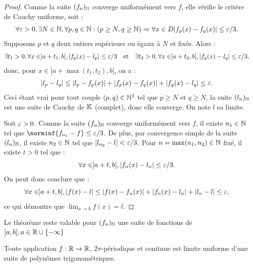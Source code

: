 \documentclass{article}
\begin{document}
\begin{proof}
Comme la suite $(f_n)_{\mathbb{N}}$ converge uniformément vers $f$, elle vérifie le critère de Cauchy uniforme, soit :
\[ \forall \varepsilon > 0, \exists N \in \mathbb{N}, \forall p,q \in \mathbb{N} : 
(p \geq N, q \geq \mathbb{N}) \Rightarrow \forall x \in D \lvert f_p(x) - f_q(x)\rvert \leq \varepsilon/3 . \]
Supposons $p$ et $q$ deux entiers supérieurs ou égaux à $N$ et fixés. Alors :
\[ \exists t_1 > 0, \forall x \in ]a+t_1 , b[, \lvert f_p(x) - l_p\rvert \leq \varepsilon/3 \quad \text{et} \quad 
\exists t_2 > 0, \forall x \in ]a+t_2 , b[, \lvert f_q(x) - l_q\rvert \leq \varepsilon/3 , \]
donc, pour $x \in ]a+\max(t_1, t_2) , b[$, on a :
\[ \lvert l_p-l_q\rvert \leq \lvert l_p - f_p(x)\rvert + \lvert f_p(x) - f_q(x)\rvert + \lvert f_q(x) - l_q\rvert \leq \varepsilon . \]
Ceci étant vrai pour tout couple $(p,q) \in \mathbb{N}^2$ tel que $p \geq N$ et $q \geq N$, la suite $(l_n)_{\mathbb{N}}$ est une suite de Cauchy de $\mathbb{K}$ 
(complet), donc elle converge.  On note $l$ sa limite. \newline

Soit $\varepsilon >0$. Comme la suite $(f_n)_{\mathbb{N}}$ converge uniformément vers $f$, 
il existe $n_1 \in \mathbb{N}$ tel que $\norminf{f_{n_1}-f} \leq \veps/3$.
De plus, par convergence simple de la suite $(l_n)_{\mathbb{N}}$, il existe $n_2 \in \mathbb{N}$ tel que $\lvert l_{n_2} - l\rvert < \varepsilon/3$.
Pour $n = \max(n_1, n_2) \in \mathbb{N}$ fixé, il existe $t >0$ tel que :
\[ \forall x \in ]a+t , b[, \lvert f_n(x) - l_n\rvert \leq \varepsilon/3 . \]
On peut donc conclure que :
\[ \forall x \in ]a+t , b[, \lvert f(x) - l\rvert \leq \lvert f(x)-f_n(x)\rvert + \lvert f_n(x) - l_n\rvert + \lvert l_n - l\rvert \leq \varepsilon , \]
ce qui démontre que $\lim_{x \to b} f(x) = l$.
 \end{proof}
 
\begin{rmq}
Le théorème reste valable pour $(f_n)_{\mathbb{N}}$ une suite de fonctions de $]a,b], a \in \mathbb{R} \cup \{-\infty\}$
\end{rmq}

\begin{thm}[Fejér]
Toute application $f:\mathbb{R} \to \mathbb{R}$, $2\pi$-périodique et conitnue est limite uniforme d'une suite de polynômes trigonométriques.
\end{thm}
\end{document}
